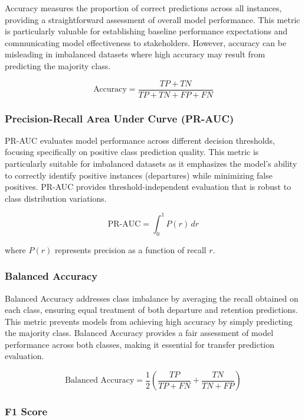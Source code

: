 Accuracy measures the proportion of correct predictions across all instances, providing a straightforward assessment of overall model performance. This metric is particularly valuable for establishing baseline performance expectations and communicating model effectiveness to stakeholders. However, accuracy can be misleading in imbalanced datasets where high accuracy may result from predicting the majority class.

\begin{equation}
\text{Accuracy} = \frac{TP + TN}{TP + TN + FP + FN}
\end{equation}

\subsubsection{Precision-Recall Area Under Curve (PR-AUC)}

PR-AUC evaluates model performance across different decision thresholds, focusing specifically on positive class prediction quality. This metric is particularly suitable for imbalanced datasets as it emphasizes the model's ability to correctly identify positive instances (departures) while minimizing false positives. PR-AUC provides threshold-independent evaluation that is robust to class distribution variations.

\begin{equation}
\text{PR-AUC} = \int_0^1 P(r) \, dr
\end{equation}

where $P(r)$ represents precision as a function of recall $r$.

\subsubsection{Balanced Accuracy}

Balanced Accuracy addresses class imbalance by averaging the recall obtained on each class, ensuring equal treatment of both departure and retention predictions. This metric prevents models from achieving high accuracy by simply predicting the majority class. Balanced Accuracy provides a fair assessment of model performance across both classes, making it essential for transfer prediction evaluation.

\begin{equation}
\text{Balanced Accuracy} = \frac{1}{2}\left(\frac{TP}{TP + FN} + \frac{TN}{TN + FP}\right)
\end{equation}

\subsubsection{F1 Score}

